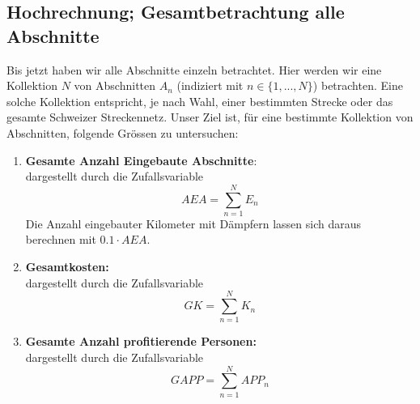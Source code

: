 %	
\subsection{Hochrechnung; Gesamtbetrachtung alle Abschnitte}
Bis jetzt haben wir alle Abschnitte einzeln betrachtet. Hier werden wir eine Kollektion $N$ von Abschnitten $A_n$ (indiziert mit $n \in \{1,...,N\}$) betrachten. Eine solche Kollektion entspricht, je nach Wahl, einer bestimmten Strecke oder das gesamte Schweizer Streckennetz. Unser Ziel ist, für eine bestimmte Kollektion von Abschnitten, folgende Grössen zu untersuchen: 
\begin{enumerate}
	\item \textbf{Gesamte Anzahl Eingebaute Abschnitte}:\\ dargestellt durch die Zufallsvariable
	\begin{equation}\label{E:AEA}
		AEA=\sum_{n=1}^{N} E_n
	\end{equation}
	Die Anzahl eingebauter Kilometer mit Dämpfern lassen sich daraus berechnen mit $0.1\cdot AEA$.
	\item \textbf{Gesamtkosten:}\\ dargestellt durch die Zufallsvariable
	\begin{equation}\label{E:GK}
		GK=\sum_{n=1}^{N} K_n
	\end{equation}
	\item \textbf{Gesamte Anzahl profitierende Personen:}\\dargestellt durch die Zufallsvariable
	\begin{equation}\label{E:GAPP}
		GAPP=\sum_{n=1}^{N} APP_n
	\end{equation}
\end{enumerate}
